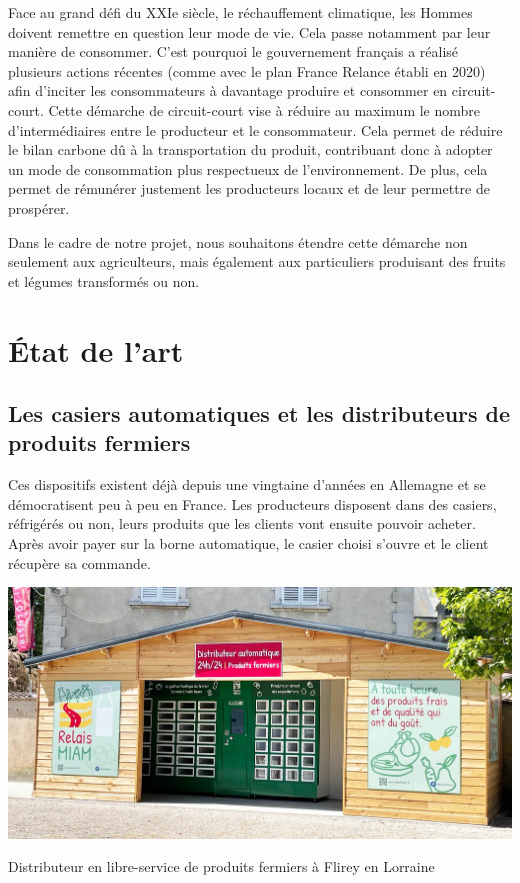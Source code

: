 \documentclass[11pt]{article}
\begin{document}
Face au grand défi du XXIe siècle, le réchauffement climatique, les Hommes doivent remettre en question leur mode de vie. Cela passe notamment par leur manière de consommer. C’est pourquoi le gouvernement français a réalisé plusieurs actions récentes (comme avec le plan France Relance établi en 2020) afin d’inciter les consommateurs à davantage produire et consommer en circuit-court. Cette démarche de circuit-court vise à réduire au maximum le nombre d’intermédiaires entre le producteur et le consommateur. Cela permet de réduire le bilan carbone dû à la transportation du produit, contribuant donc à adopter un mode de consommation plus respectueux de l’environnement. De plus, cela permet de rémunérer justement les producteurs locaux et de leur permettre de prospérer. 
\vspace{0.2cm}

Dans le cadre de notre projet, nous souhaitons étendre cette démarche non seulement aux agriculteurs, mais également aux particuliers produisant des fruits et légumes transformés ou non. 
\section{État de l'art}

\subsection{Les casiers automatiques et les distributeurs de produits fermiers}

Ces dispositifs existent déjà depuis une vingtaine d'années en Allemagne et se démocratisent peu à peu en France. Les producteurs disposent dans des casiers, réfrigérés ou non, leurs produits que les clients vont ensuite pouvoir acheter. Après avoir payer sur la borne automatique, le casier choisi s'ouvre et le client récupère sa commande.

\begin{center}
\includegraphics[scale=0.17]{distributeur-produits-fermiers-flirey-54470.jpg}

Distributeur en libre-service de produits fermiers à Flirey en Lorraine
\end{center}
\end{document}
